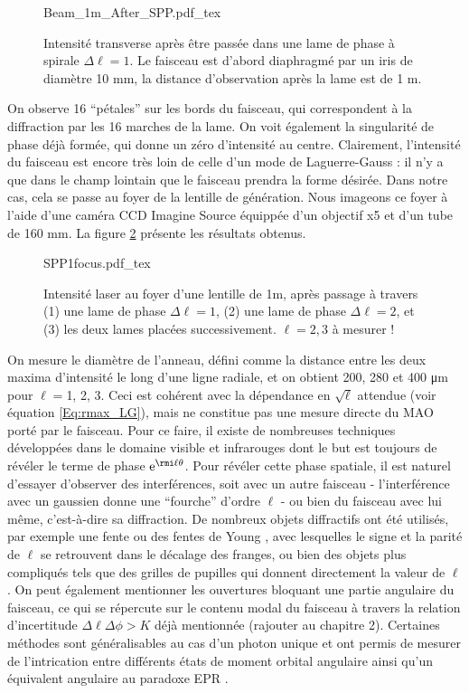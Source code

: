 \begin{figure}[!ht]
\centering
\def\svgwidth{0.4\columnwidth}
{Beam_1m_After_SPP.pdf_tex}
\caption{Intensité transverse après être passée dans une lame de phase à spirale $\Delta\ell = 1$. Le faisceau est d'abord diaphragmé par un iris de diamètre 10 mm, la distance d'observation après la lame est de 1 m.}
\label{Fig:BeamAfterSPP}
\end{figure}

On observe 16 ``pétales'' sur les bords du faisceau, qui correspondent à la diffraction par les 16 marches de la lame. On voit également la singularité de phase déjà formée, qui donne un zéro d'intensité au centre. Clairement, l'intensité du faisceau est encore très loin de celle d'un mode de Laguerre-Gauss : il n'y a que dans le champ lointain que le faisceau prendra la forme désirée. Dans notre cas, cela se passe au foyer de la lentille de génération. Nous imageons ce foyer à l'aide d'une caméra CCD Imagine Source équippée d'un objectif x5 et d'un tube de 160 mm. La figure \ref{Fig:LGFocus} présente les résultats obtenus.\par
\begin{figure}[!ht]
\centering
\def\svgwidth{0.8\columnwidth}
{SPP1focus.pdf_tex}
\caption{Intensité laser au foyer d'une lentille de 1m, après passage à travers (1) une lame de phase $\Delta\ell = 1$, (2) une lame de phase $\Delta\ell = 2$, et (3) les deux lames placées successivement. \textcolor[rgb]{1,0,0}{$\ell=2,3$ à mesurer !}}
\label{Fig:LGFocus}
\end{figure}
On mesure le diamètre de l'anneau, défini comme la distance entre les deux maxima d'intensité le long d'une ligne radiale, et on obtient 200, 280 et 400 \si{\um} pour $\ell=$1, 2, 3. Ceci est cohérent avec la dépendance en $\sqrt{\ell}$ attendue (voir équation \ref{Eq:rmax_LG}), mais ne constitue pas une mesure directe du MAO porté par le faisceau. Pour ce faire, il existe de nombreuses techniques développées dans le domaine visible et infrarouges dont le but est toujours de révéler le terme de phase $\mathrm{e}^{\rmi\ell\theta}$. Pour révéler cette phase spatiale, il est naturel d'essayer d'observer des interférences, soit avec un autre faisceau - l'interférence avec un gaussien donne une ``fourche'' d'ordre $\ell$  - ou bien du faisceau avec lui même, c'est-à-dire sa diffraction. De nombreux objets diffractifs ont été utilisés, par exemple une fente  ou des fentes de Young , avec lesquelles le signe et la parité de $\ell$ se retrouvent dans le décalage des franges, ou bien des objets plus compliqués tels que des grilles de pupilles  qui donnent directement la valeur de $\ell$. On peut également mentionner les ouvertures bloquant une partie angulaire du faisceau, ce qui se répercute sur le contenu modal du faisceau à travers la relation d'incertitude $\Delta\ell\Delta\phi > K$ déjà mentionnée (\textcolor[rgb]{1,0,0}{rajouter au chapitre 2}). Certaines méthodes sont généralisables au cas d'un photon unique et ont permis de mesurer de l'intrication entre différents états de moment orbital angulaire  ainsi qu'un équivalent angulaire au paradoxe EPR . \par 
